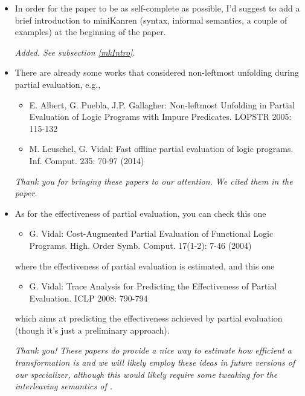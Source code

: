 \begin{itemize}
  \item In order for the paper to be as self-complete as possible, I'd suggest to add a brief introduction to miniKanren (syntax, informal semantics, a couple of examples) at the beginning of the paper.

  \emph{Added. See subsection \ref{mkIntro}.}

  \item There are already some works that considered non-leftmost unfolding during partial evaluation, e.g.,

  \begin{itemize}
    \item  E. Albert, G. Puebla, J.P. Gallagher: Non-leftmost Unfolding in Partial Evaluation of Logic Programs with Impure Predicates. LOPSTR 2005: 115-132
    \item M. Leuschel, G. Vidal: Fast offline partial evaluation of logic programs. Inf. Comput. 235: 70-97 (2014)
  \end{itemize}

  \emph{Thank you for bringing these papers to our attention. We cited them in the paper.}

  \item As for the effectiveness of partial evaluation, you can check this one

  \begin{itemize}
    \item G. Vidal: Cost-Augmented Partial Evaluation of Functional Logic Programs. High. Order Symb. Comput. 17(1-2): 7-46 (2004)
  \end{itemize}

  where the effectiveness of partial evaluation is estimated, and this one

  \begin{itemize}
    \item G. Vidal: Trace Analysis for Predicting the Effectiveness of Partial Evaluation. ICLP 2008: 790-794
  \end{itemize}

  which aims at predicting the effectiveness achieved by partial evaluation
  (though it's just a preliminary approach).

  \emph{Thank you! These papers do provide a nice way to estimate how efficient a transformation is and we will likely employ these ideas in future versions of our specializer, although this would likely require some tweaking for the interleaving semantics of \mk. }


\end{itemize}
